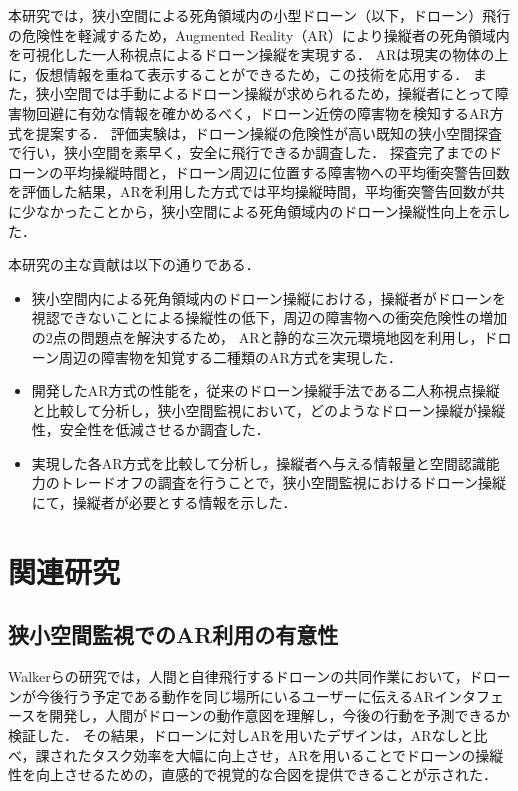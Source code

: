 \documentclass[submit, sigrecommended]{ipsj}
\begin{document}
\par
本研究では，狭小空間による死角領域内の小型ドローン（以下，ドローン）飛行の危険性を軽減するため，Augmented Reality（AR）により操縦者の死角領域内を可視化した一人称視点によるドローン操縦を実現する．
ARは現実の物体の上に，仮想情報を重ねて表示することができるため，この技術を応用する\cite{article-ar03}\cite{article-ar04}．
また，狭小空間では手動によるドローン操縦が求められるため，操縦者にとって障害物回避に有効な情報を確かめるべく，ドローン近傍の障害物を検知するAR方式を提案する．
評価実験は，ドローン操縦の危険性が高い既知の狭小空間探査で行い，狭小空間を素早く，安全に飛行できるか調査した．
探査完了までのドローンの平均操縦時間と，ドローン周辺に位置する障害物への平均衝突警告回数を評価した結果，ARを利用した方式では平均操縦時間，平均衝突警告回数が共に少なかったことから，狭小空間による死角領域内のドローン操縦性向上を示した．
\par
本研究の主な貢献は以下の通りである．
\begin{itemize}
  \item 狭小空間内による死角領域内のドローン操縦における，操縦者がドローンを視認できないことによる操縦性の低下，周辺の障害物への衝突危険性の増加の2点の問題点を解決するため，
  ARと静的な三次元環境地図を利用し，ドローン周辺の障害物を知覚する二種類のAR方式を実現した．
  \item 開発したAR方式の性能を，従来のドローン操縦手法である二人称視点操縦と比較して分析し，狭小空間監視において，どのようなドローン操縦が操縦性，安全性を低減させるか調査した．
  \item 実現した各AR方式を比較して分析し，操縦者へ与える情報量と空間認識能力のトレードオフの調査を行うことで，狭小空間監視におけるドローン操縦にて，操縦者が必要とする情報を示した．
\end{itemize}

\section{関連研究}
\subsection{狭小空間監視でのAR利用の有意性}
Walkerらの研究\cite{book-ar01}では，人間と自律飛行するドローンの共同作業において，ドローンが今後行う予定である動作を同じ場所にいるユーザーに伝えるARインタフェースを開発し，人間がドローンの動作意図を理解し，今後の行動を予測できるか検証した．
その結果，ドローンに対しARを用いたデザインは，ARなしと比べ，課されたタスク効率を大幅に向上させ，ARを用いることでドローンの操縦性を向上させるための，直感的で視覚的な合図を提供できることが示された．
\end{document}

